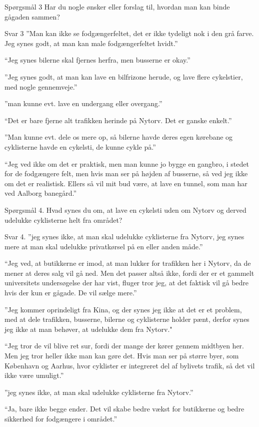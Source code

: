 \begin{appendics}
Spørgsmål 3
Har du nogle ønsker eller forslag til, hvordan man kan binde gågaden sammen?

Svar 3
”Man kan ikke se fodgængerfeltet, det er ikke tydeligt nok i den grå farve. Jeg synes godt, at man kan male fodgængerfeltet hvidt.”

“Jeg synes bilerne skal fjernes herfra, men busserne er okay.” 

”Jeg synes godt, at man kan lave en bilfrizone herude, og lave flere cykelstier, med nogle gennemveje.”

”man kunne evt. lave en undergang eller overgang.”

“Det er bare fjerne alt trafikken herinde på Nytorv. Det er ganske enkelt.”

”Man kunne evt. dele os mere op, så bilerne havde deres egen kørebane og cyklisterne havde en cykelsti, de kunne cykle på.”

“Jeg ved ikke om det er praktisk, men man kunne jo bygge en gangbro, i stedet for de fodgængere felt, men hvis man ser på højden af busserne, så ved jeg ikke om det er realistisk. Ellers så vil mit bud være, at lave en tunnel, som man har ved Aalborg banegård.” 

Spørgsmål 4. 
Hvad synes du om, at lave en cykelsti uden om Nytorv og derved udelukke cyklisterne helt fra området?

Svar 4. 
”jeg synes ikke, at man skal udelukke cyklisterne fra Nytorv, jeg synes mere at man skal udelukke privatkørsel på en eller anden måde.”

“Jeg ved, at butikkerne er imod, at man lukker for trafikken her i Nytorv, da de mener at deres salg vil gå ned. Men det passer altså ikke, fordi der er et gammelt universitets undersøgelse der har vist, fluger tror jeg, at det faktisk vil gå bedre hvis der kun er gågade. De vil sælge mere.”

”Jeg kommer oprindeligt fra Kina, og der synes jeg ikke at det er et problem, med at dele trafikken, busserne, bilerne og cyklisterne holder pænt, derfor synes jeg ikke at man behøver, at udelukke dem fra Nytorv." 

“Jeg tror de vil blive ret sur, fordi der mange der kører gennem midtbyen her. Men jeg tror heller ikke man kan gøre det. Hvis man ser på større byer, som København og Aarhus, hvor cyklister er integreret del af bylivets trafik, så det vil ikke være umuligt.”

”jeg synes ikke, at man skal udelukke cyklisterne fra Nytorv.”

“Ja, bare ikke begge ender. Det vil skabe bedre vækst for butikkerne og bedre sikkerhed for fodgængere i området.”


\end{appendics}
